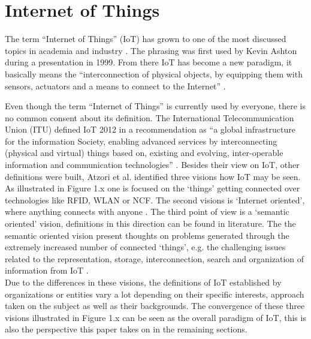 \section{Internet of Things}
The term ``Internet of Things'' (IoT) has grown to one of the most discussed topics in academia and industry \cite{ju}. The phrasing was first used by Kevin Ashton during a presentation in 1999. From there IoT has become a new paradigm, it basically means the ``interconnection of physical objects, by equipping them with sensors, actuators and a means to connect to the Internet'' \cite{dijkman}.

Even though the term ``Internet of Things'' is currently used by everyone, there is no common consent about its definition. The International Telecommunication Union (ITU) defined IoT 2012 in a recommendation as ``a global infrastructure for the information Society, enabling advanced services by interconnecting (physical and virtual) things based on, existing and evolving, inter-operable information and communication technologies'' \cite{itu}. Besides their view on IoT, other definitions were built, Atzori et al. identified three visions how IoT may be seen. As illustrated in Figure 1.x one is focused on the `things' getting connected over technologies like RFID, WLAN or NCF. The second visions is `Internet oriented', where anything connects with anyone . The third point of view is a `semantic oriented' vision, definitions in this direction can be found in literature. The the semantic oriented vision present thoughts on problems generated through the extremely increased number of connected `things', e.g. the challenging issues related to the representation, storage, interconnection, search and organization of information from IoT \cite{atzori}.\\
Due to the differences in these visions, the definitions of IoT established by organizations or entities vary a lot depending on their specific interests, approach taken on the subject as well as their backgrounds. The convergence of these three visions illustrated in Figure 1.x can be seen as the overall paradigm of IoT, this is also the perspective this paper takes  on in the remaining sections. 
